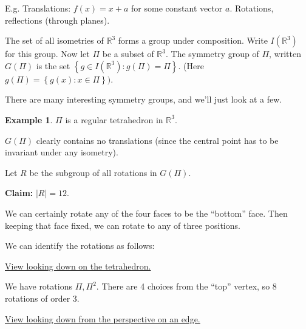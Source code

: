 \documentclass{article}
\theoremstyle{definition}
\newtheorem*{exmp}{Example}
\newcommand{\reals}{\mathbb{R}}
\begin{document}
  E.g. Translations: $f(x)=x+a$ for some constant vector $a$. Rotations, reflections (through planes). 

  The set of all isometries of $\reals^3$ forms a group under composition. Write $I(\reals^3)$ for this group. Now let $\Pi$ be a subset of $\reals^3$. The symmetry group of $\Pi$, written $G(\Pi)$ is the set $\left\{ g \in I(\reals^3):g(\Pi) = \Pi \right\}$. (Here $g(\Pi)=\left\{  g(x):x \in \Pi \right\})$.

  There are many interesting symmetry groups, and we'll just look at a few. \\
  \begin{exmp}
    $\Pi$ is a regular tetrahedron in $\reals^3$.

    $G(\Pi)$ clearly contains no translations (since the central point has to be invariant under any isometry).

    Let $R$ be the subgroup of all rotations in $G(\Pi)$.

    \textbf{Claim:} $|R|=12$.

    We can certainly rotate any of the four faces to be the ``bottom'' face. Then keeping that face fixed, we can rotate to any of three positions.

    We can identify the rotations as follows:

    \underline{View looking down on the tetrahedron.}

    \begin{figure}[h]
      \centering
      \label{fig:lookingdown}
    \end{figure}


    We have rotations $\Pi, \Pi^2$. There are 4 choices from the ``top'' vertex, so 8 rotations of order 3.

    \underline{View looking down from the perspective on an edge.}
    \begin{figure}[h]
      \centering
      \label{fig:lookingdownedge}
    \end{figure}


\end{exmp}
\end{document}

